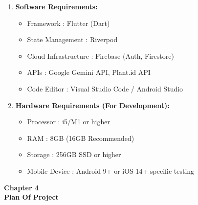 \documentclass[12pt, a4paper]{report}
\begin{document}
\begin{enumerate}[label={\Roman*.}]
    \item \textbf{Software Requirements:}
    \begin{itemize}
  \item Framework      \hspace{20mm}       : Flutter (Dart)
  \item State Management \hspace{6mm} : Riverpod
  \item Cloud Infrastructure \hspace{3mm}:  Firebase (Auth, Firestore)
  \item APIs \hspace{28mm}: Google Gemini API, Plant.id API
  \item Code Editor \hspace{15mm}: Visual Studio Code / Android Studio
\end{itemize}
   \item \textbf{ Hardware Requirements (For Development):}
    \begin{itemize}
  \item Processor \hspace{19mm} : i5/M1 or higher 
  \item RAM \hspace{26mm} : 8GB (16GB Recommended)
  \item Storage \hspace{22mm} : 256GB SSD or higher
  \item Mobile Device \hspace{12mm} : Android 9+ or iOS 14+ specific testing
\end{itemize}
\end{enumerate}


\newpage
\vspace*{\fill}
\begin{center}
\textbf{\Huge{Chapter 4}}\\
\vspace{5mm}
\textbf{\Huge{Plan Of Project}}
\end{center}
\vspace*{\fill}
\newpage
\titleformat{\chapter}[block]{\normalfont}{}{0pt}{}
\titlespacing{\chapter}{0pt}{-2em}{0pt}
\end{document}
